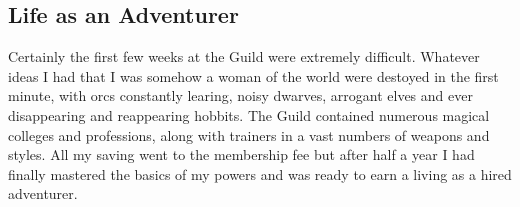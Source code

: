 \documentclass{article}
\begin{document}
\subsection{Life as an Adventurer}

Certainly the first few weeks at the Guild were extremely
difficult.  Whatever ideas I had that I was somehow a woman of the
world were destoyed in the first minute, with orcs constantly learing,
noisy dwarves, arrogant elves and ever disappearing and reappearing
hobbits.  The Guild contained numerous magical colleges and
professions, along with trainers in a vast numbers of weapons and
styles. All my saving went to the membership fee but after half a year
I had finally mastered the basics of my powers and was ready to earn a
living as a hired adventurer.
\end{document}
